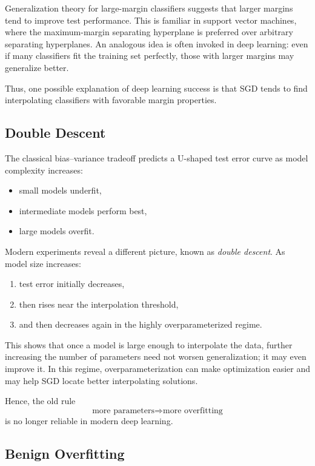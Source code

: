 Generalization theory for large-margin classifiers suggests that larger margins tend to improve test performance. This is familiar in support vector machines, where the maximum-margin separating hyperplane is preferred over arbitrary separating hyperplanes. An analogous idea is often invoked in deep learning: even if many classifiers fit the training set perfectly, those with larger margins may generalize better.

Thus, one possible explanation of deep learning success is that SGD tends to find interpolating classifiers with favorable margin properties.

\subsection{Double Descent}

The classical bias--variance tradeoff predicts a U-shaped test error curve as model complexity increases:
\begin{itemize}
    \item small models underfit,
    \item intermediate models perform best,
    \item large models overfit.
\end{itemize}

Modern experiments reveal a different picture, known as \emph{double descent}. As model size increases:
\begin{enumerate}
    \item test error initially decreases,
    \item then rises near the interpolation threshold,
    \item and then decreases again in the highly overparameterized regime.
\end{enumerate}

This shows that once a model is large enough to interpolate the data, further increasing the number of parameters need not worsen generalization; it may even improve it. In this regime, overparameterization can make optimization easier and may help SGD locate better interpolating solutions.

Hence, the old rule
\[
\text{more parameters} \Rightarrow \text{more overfitting}
\]
is no longer reliable in modern deep learning.

\subsection{Benign Overfitting}

